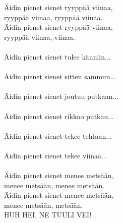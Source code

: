 
Äidin pienet sienet ryyppää viinaa, \\ ryyppää viinaa, ryyppää viinaa. \\ Äidin pienet sienet ryyppää viinaa, \\ ryyppää viinaa, viinaa. \\ \hspace{10mm} \\ Äidin pienet sienet tulee känniin... \\ \hspace{10mm} \\ Äidin pienet sienet sitten sammuu... \\ \hspace{10mm} \\ Äidin pienet sienet joutuu putkaan... \\ \hspace{10mm} \\ Äidin pienet sienet rikkoo putkan... \\ \hspace{10mm} \\ Äidin pienet sienet tekee tehtaan... \\ \hspace{10mm} \\ Äidin pienet sienet tekee viinaa... \\ \hspace{10mm} \\ Äidin pienet sienet menee metsään, \\ menee metsään, menee metsään. \\ Äidin pienet sienet menee metsään, \\ menee metsään, metsään. \\ HUH HEI, NE TUULI VEI!